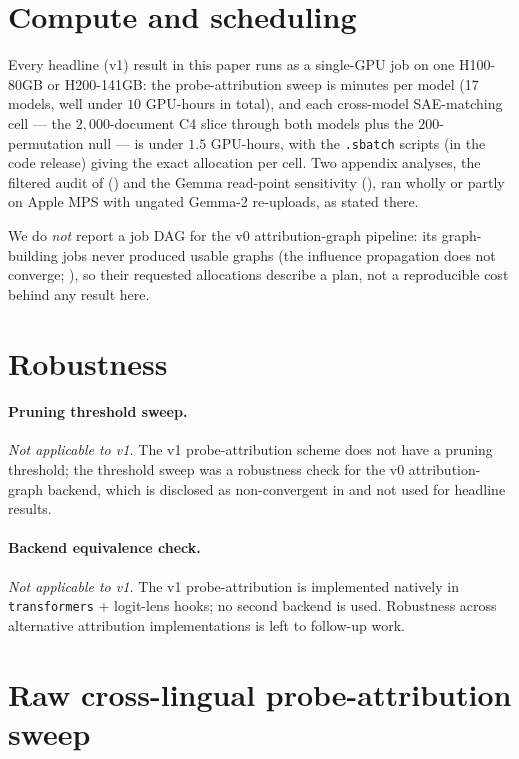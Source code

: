 \section{Compute and scheduling}\label{app:scheduling}

Every headline (v1) result in this paper runs as a single-GPU job on one H100-80GB or
H200-141GB: the probe-attribution sweep is minutes per model (17 models, well under $10$
GPU-hours in total), and each cross-model SAE-matching cell --- the $2{,}000$-document C4
slice through both models plus the $200$-permutation null --- is under $1.5$ GPU-hours,
with the \texttt{.sbatch} scripts (in the code release) giving the exact allocation per cell.
Two appendix analyses, the filtered audit of \citet{lan2024universal} () and
the Gemma read-point sensitivity (), ran wholly or partly on Apple MPS with ungated
Gemma-2 re-uploads, as stated there.

We do \emph{not} report a job DAG for the v0 attribution-graph pipeline: its graph-building
jobs never produced usable graphs (the influence propagation does not converge;
), so their requested allocations describe a plan, not
a reproducible cost behind any result here.

\section{Robustness}\label{app:robustness}

\paragraph{Pruning threshold sweep.} \emph{Not applicable to v1.}
The v1 probe-attribution scheme does not have a pruning threshold; the
threshold sweep was a robustness check for the v0 attribution-graph
backend, which is disclosed as non-convergent in  and not
used for headline results.

\paragraph{Backend equivalence check.} \emph{Not applicable to v1.}
The v1 probe-attribution is implemented natively in
\texttt{transformers} + logit-lens hooks; no second backend is used.
Robustness across alternative attribution implementations is left
to follow-up work.

\section{Raw cross-lingual probe-attribution sweep}\label{app:probe_attribution}

